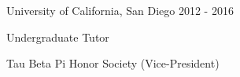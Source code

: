 
\begin{cventries}
  \cveducation
    {University of California, San Diego}
    {2012 - 2016}
    {
      \vspace{-4.5mm}
      \begin{description}
        \item \hspace{-2mm}{Double Degree (Summa Cum Laude)}
        \begin{description}
          \item \hspace{-6mm}{B.S. Computer Science}
          \item \hspace{-6mm}{B.S. Applied Mathematics}
        \end{description}
      \end{description}
      \vspace{-4.0mm}
    }
    {
      \begin{cvitems}
        \item {Undergraduate Tutor}
        \item {Tau Beta Pi Honor Society (Vice-President)}
      \end{cvitems}
    }
\end{cventries}
